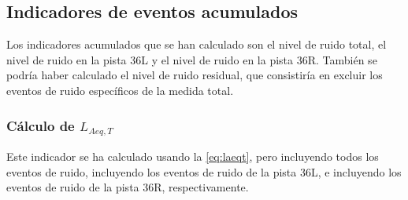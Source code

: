 \documentclass[11pt]{article}
\begin{document}
\subsection{Indicadores de eventos acumulados}

Los indicadores acumulados que se han calculado son el nivel de ruido total, el nivel de ruido en la pista 36L y el nivel de ruido en la pista 36R. También se podría haber calculado el nivel de ruido residual, que consistiría en excluir los eventos de ruido específicos de la medida total.

\subsubsection{Cálculo de $L_{Aeq,T}$}

Este indicador se ha calculado usando la \autoref{eq:laeqt}, pero incluyendo todos los eventos de ruido, incluyendo los eventos de ruido de la pista 36L, e incluyendo los eventos de ruido de la pista 36R, respectivamente.
\end{document}
